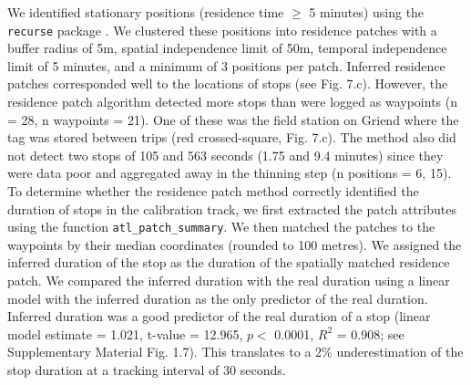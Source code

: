 \documentclass[10pt,paper=a4,headings=standardclasses
]{scrartcl}
\begin{document}
We identified stationary positions (residence time $\geq$ 5 minutes) using the \texttt{recurse} package \citep[n = 837, 46.42 \%; radius = 50m][]{bracis2018}.
We clustered these positions into residence patches with a buffer radius of 5m, spatial independence limit of 50m, temporal independence limit of 5 minutes, and a minimum of 3 positions per patch.
Inferred residence patches corresponded well to the locations of stops (see Fig. 7.c).
However, the residence patch algorithm detected more stops than were logged as waypoints (n = 28, n waypoints = 21).
One of these was the field station on Griend where the tag was stored between trips (red crossed-square, Fig. 7.c).
The method also did not detect two stops of 105 and 563 seconds (1.75 and 9.4 minutes) since they were data poor and aggregated away in the thinning step (n positions = 6, 15).
To determine whether the residence patch method correctly identified the duration of stops in the calibration track, we first extracted the patch attributes using the function \texttt{atl\_patch\_summary}.
We then matched the patches to the waypoints by their median coordinates (rounded to 100 metres).
We assigned the inferred duration of the stop as the duration of the spatially matched residence patch.
We compared the inferred duration with the real duration using a linear model with the inferred duration as the only predictor of the real duration.
Inferred duration was a good predictor of the real duration of a stop (linear model estimate = 1.021, t-value = 12.965, $p <$ 0.0001, $R^2$ = 0.908; see Supplementary Material Fig. 1.7).
This translates to a 2\% underestimation of the stop duration at a tracking interval of 30 seconds.
\end{document}
